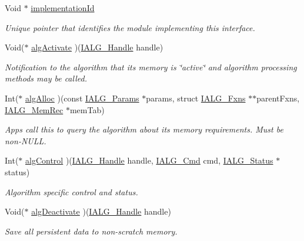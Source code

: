 \begin{CompactItemize}
\item 
Void $\ast$ \hyperlink{struct_i_a_l_g___fxns_83963e2ca17632c15bdb01494481a615}{implementation\-Id}
\begin{CompactList}\small\item\em Unique pointer that identifies the module implementing this interface. \item\end{CompactList}\item 
Void($\ast$ \hyperlink{struct_i_a_l_g___fxns_f1213efc8ac6fdfb72b50da9950baaa7}{alg\-Activate} )(\hyperlink{struct_i_a_l_g___obj}{IALG\_\-Handle} handle)
\begin{CompactList}\small\item\em Notification to the algorithm that its memory is \char`\"{}active\char`\"{} and algorithm processing methods may be called. \item\end{CompactList}\item 
Int($\ast$ \hyperlink{struct_i_a_l_g___fxns_1640ba8f4033af1ce3887283c7a12746}{alg\-Alloc} )(const \hyperlink{struct_i_a_l_g___params}{IALG\_\-Params} $\ast$params, struct \hyperlink{struct_i_a_l_g___fxns}{IALG\_\-Fxns} $\ast$$\ast$parent\-Fxns, \hyperlink{struct_i_a_l_g___mem_rec}{IALG\_\-Mem\-Rec} $\ast$mem\-Tab)
\begin{CompactList}\small\item\em Apps call this to query the algorithm about its memory requirements. Must be non-NULL. \item\end{CompactList}\item 
Int($\ast$ \hyperlink{struct_i_a_l_g___fxns_4c506a1599a604b02b30097e61ff4b89}{alg\-Control} )(\hyperlink{struct_i_a_l_g___obj}{IALG\_\-Handle} handle, \hyperlink{group__ti__xdais___i_a_l_g_g9032f20923ef2ba1d6b88c87a20075fa}{IALG\_\-Cmd} cmd, \hyperlink{struct_i_a_l_g___status}{IALG\_\-Status} $\ast$status)
\begin{CompactList}\small\item\em Algorithm specific control and status. \item\end{CompactList}\item 
Void($\ast$ \hyperlink{struct_i_a_l_g___fxns_10f29860ab8b3beab69b0f0128c3d969}{alg\-Deactivate} )(\hyperlink{struct_i_a_l_g___obj}{IALG\_\-Handle} handle)
\begin{CompactList}\small\item\em Save all persistent data to non-scratch memory. \item\end{CompactList}\item 
$$
\end{CompactItemize}
